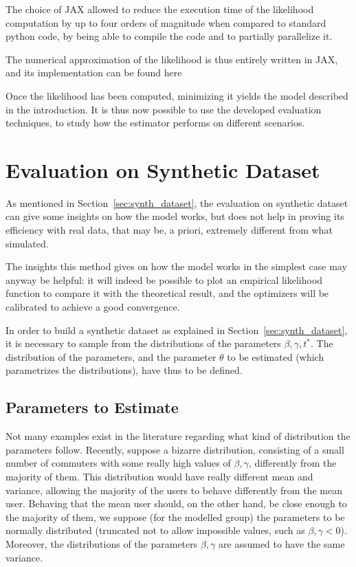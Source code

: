 The choice of JAX allowed to reduce the execution time of the likelihood computation by up to four orders of magnitude when compared to standard python code,
by being able to compile the code and to partially parallelize it.

The numerical approximation of the likelihood is thus entirely written in JAX,
and its implementation can be found here

Once the likelihood has been computed,
minimizing it yields the model described in the introduction.
It is thus now possible to use the developed evaluation techniques,
to study how the estimator performs on different scenarios.

\section{Evaluation on Synthetic Dataset}
\label{sec:eval_synth_dataset}

As mentioned in Section~\ref{sec:synth_dataset},
the evaluation on synthetic dataset can give some insights on how the model works,
but does not help in proving its efficiency with real data,
that may be, a priori, extremely different from what simulated.

The insights this method gives on how the model works in the simplest case may anyway be helpful:
it will indeed be possible to plot an empirical likelihood function to compare it with the theoretical result,
and the optimizers will be calibrated to achieve a good convergence.

In order to build a synthetic dataset as explained in Section~\ref{sec:synth_dataset},
it is necessary to sample from the distributions of the parameters \(\beta, \gamma, t^*\).
The distribution of the parameters,
and the parameter \(\theta\) to be estimated (which parametrizes the distributions),
have thus to be defined.

\subsection{Parameters to Estimate}

Not many examples exist in the literature regarding what kind of distribution the parameters follow.
Recently, \textcite{https://doi.org/10.1111/iere.12692} suppose a bizarre distribution,
consisting of a small number of commuters with some really high values of \(\beta, \gamma\),
differently from the majority of them.
This distribution would have really different mean and variance,
allowing the majority of the users to behave differently from the mean user.
Behaving that the mean user should, on the other hand,
be close enough to the majority of them, we suppose
(for the modelled group) the parameters to be normally distributed
(truncated not to allow impossible values, such as \(\beta, \gamma < 0\)).
Moreover, the distributions of the parameters \(\beta, \gamma\) are assumed to have the same variance.

